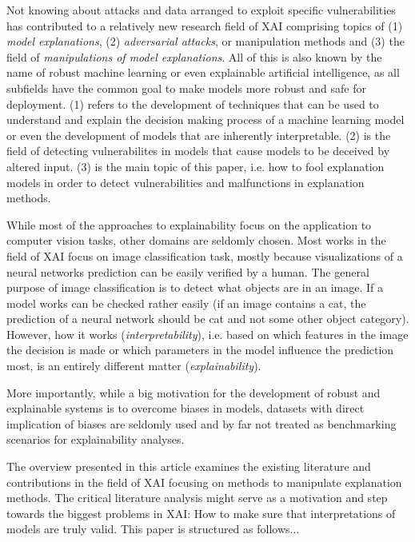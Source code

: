 Not knowing about attacks and data arranged to exploit specific vulnerabilities has contributed to a relatively new research field of XAI comprising topics of (1) \textit{model explanations}, (2) \textit{adversarial attacks}, or manipulation methods and (3) the field of \textit{manipulations of model explanations}. All of this is also known by the name of robust machine learning or even explainable artificial intelligence, as all subfields have the common goal to make models more robust and safe for deployment. 
(1) refers to the development of techniques that can be used to understand and explain the decision making process of a machine learning model or even the development of models that are inherently interpretable. (2) is the field of detecting vulnerabilites in models that cause models to be deceived by altered input. 
(3) is the main topic of this paper, i.e. how to fool explanation models in order to detect vulnerabilities and malfunctions in explanation methods. 


While most of the approaches to explainability focus on the application to computer vision tasks, other domains are seldomly chosen. 
Most works in the field of XAI focus on image classification task, mostly because visualizations of a neural networks prediction can be easily verified by a human. The general purpose of image classification is to detect what objects are in an image. If a model works can be checked rather easily (if an image contains a cat, the prediction of a neural network should be cat and not some other object category). However, how it works (\textit{interpretability}), i.e. based on which features in the image the decision is made or which parameters in the model influence the prediction most, is an entirely different matter (\textit{explainability}).  


More importantly, while a big motivation for the development of robust and explainable systems is to overcome biases in models, datasets with 
direct implication of biases are seldomly used and by far not treated as benchmarking scenarios for explainability analyses.  






The overview presented in this article examines the existing literature and contributions in the field of XAI focusing on methods to manipulate explanation methods.  
The critical literature analysis might serve as a motivation and step towards the biggest problems in XAI: How to make sure that interpretations of models are truly valid. 
This paper is structured as follows... 
